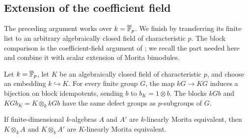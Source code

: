 \subsection{Extension of the coefficient field}
\label{sec:coefficient-extension}

The preceding argument works over $k=\overline{\mathbb F}_p$.  We finish by
transferring its finite list to an arbitrary algebraically closed field
of characteristic $p$.  The block comparison is the coefficient-field
argument of \cite[Section~2.1]{BlockwiseAlperinWeight}; we recall the
part needed here and combine it with scalar extension of Morita
bimodules.

\begin{lemma}
\label{lem:coefficient-extension}
Let $k=\overline{\mathbb F}_p$, let $K$ be an algebraically closed field of
characteristic $p$, and choose an embedding $k\hookrightarrow K$.
For every finite group $G$, the map $kG\longrightarrow KG$ induces a
bijection on block idempotents, sending $b$ to $b_K=1\otimes b$.
The blocks $kGb$ and $KGb_K=K\otimes_k kGb$ have the same defect
groups as $p$-subgroups of $G$.

If finite-dimensional $k$-algebras $A$ and $A'$ are $k$-linearly
Morita equivalent, then $K\otimes_k A$ and $K\otimes_k A'$ are
$K$-linearly Morita equivalent.
\end{lemma}

